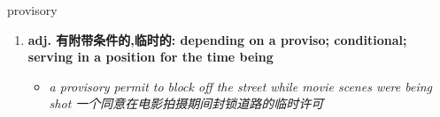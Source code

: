 
\begin{frame}
{\huge provisory}
\begin{center}
\begin{enumerate}\Large
  \item \textbf{adj. 有附带条件的,临时的: depending on a proviso; conditional; serving in a position for the time being}
  \begin{itemize}
    \item \em{\Large{a provisory permit to block off the street while movie scenes were being shot 一个同意在电影拍摄期间封锁道路的临时许可}}
  \end{itemize}
\end{enumerate}
\end{center}
\end{frame}
